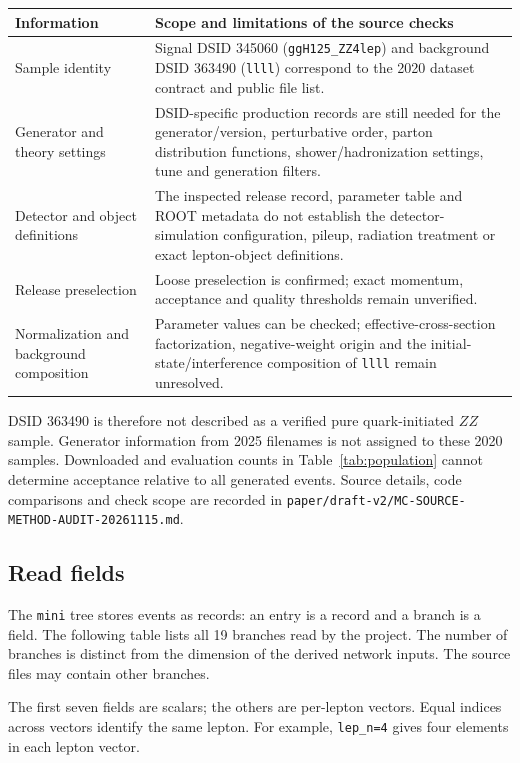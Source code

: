 \documentclass[11pt,a4paper]{article}
\begin{document}
\begin{center}
\small
\begin{tabularx}{\linewidth}{@{}>{\raggedright\arraybackslash}p{.23\linewidth}Y@{}}
\toprule
Information & Scope and limitations of the source checks \\
\midrule
Sample identity & Signal DSID 345060 (\texttt{ggH125\_ZZ4lep}) and background DSID 363490 (\texttt{llll}) correspond to the 2020 dataset contract and public file list. \\
Generator and theory settings & DSID-specific production records are still needed for the generator/version, perturbative order, parton distribution functions, shower/hadronization settings, tune and generation filters. \\
Detector and object definitions & The inspected release record, parameter table and ROOT metadata do not establish the detector-simulation configuration, pileup, radiation treatment or exact lepton-object definitions. \\
Release preselection & Loose preselection is confirmed; exact momentum, acceptance and quality thresholds remain unverified. \\
Normalization and background composition & Parameter values can be checked; effective-cross-section factorization, negative-weight origin and the initial-state/interference composition of \texttt{llll} remain unresolved. \\
\bottomrule
\end{tabularx}
\end{center}
DSID 363490 is therefore not described as a verified pure quark-initiated $ZZ$ sample. Generator information from 2025 filenames is not assigned to these 2020 samples.
Downloaded and evaluation counts in Table~\ref{tab:population} cannot determine acceptance relative to all generated events.
Source details, code comparisons and check scope are recorded in \nolinkurl{paper/draft-v2/MC-SOURCE-METHOD-AUDIT-20261115.md}.

\subsection{Read fields}
The \texttt{mini} tree stores events as records: an entry is a record and a branch is a field.
The following table lists all 19 branches read by the project.
The number of branches is distinct from the dimension of the derived network inputs. The source files may contain other branches.

The first seven fields are scalars; the others are per-lepton vectors.
Equal indices across vectors identify the same lepton.
For example, \texttt{lep\_n=4} gives four elements in each lepton vector.
\end{document}
